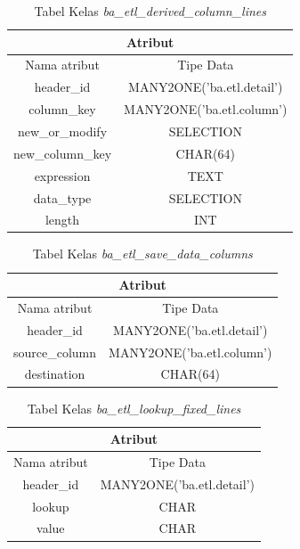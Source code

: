 \begin{table}[H]
	\centering
		\caption{Tabel Kelas \textit{ba\_etl\_derived\_column\_lines}}
		\begin{tabular}{ | c | c|}
			\hline
				\multicolumn{2}{|c|}{Atribut}\\ \hline 
				Nama atribut & Tipe Data\\ \hline
				header\_id & MANY2ONE('ba.etl.detail')\\ \hline
				column\_key & MANY2ONE('ba.etl.column')\\ \hline
				new\_or\_modify  & SELECTION\\ \hline
				new\_column\_key & CHAR(64)\\ \hline
				expression & TEXT \\ \hline
				data\_type & SELECTION \\ \hline
				length & INT \\ \hline
		\end{tabular}
\end{table}

\begin{table}[H]
	\centering
		\caption{Tabel Kelas \textit{ba\_etl\_save\_data\_columns}}
		\begin{tabular}{ | c | c|}
			\hline
				\multicolumn{2}{|c|}{Atribut}\\ \hline 
				Nama atribut & Tipe Data\\ \hline
				header\_id & MANY2ONE('ba.etl.detail')\\ \hline
				source\_column & MANY2ONE('ba.etl.column')\\ \hline
				destination & CHAR(64)\\ \hline
		\end{tabular}
\end{table}

\begin{table}[H]
	\centering
		\caption{Tabel Kelas \textit{ba\_etl\_lookup\_fixed\_lines}}
		\begin{tabular}{ | c | c|}
			\hline
				\multicolumn{2}{|c|}{Atribut}\\ \hline 
				Nama atribut & Tipe Data\\ \hline
				header\_id & MANY2ONE('ba.etl.detail')\\ \hline
				lookup & CHAR\\ \hline
				value& CHAR\\ \hline
		\end{tabular}
\end{table}

